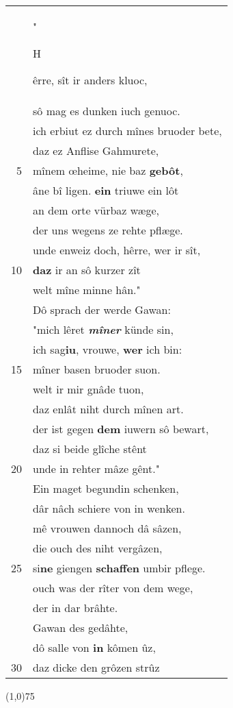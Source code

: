 \documentclass[8pt,a4paper,notitlepage]{article}
\begin{document}
\begin{table}[ht]
\begin{minipage}[t]{0.5\linewidth}
\begin{tabular}{rl}
 & "\begin{large}H\end{large}êrre, sît ir anders kluoc,\\ 
 & sô mag es dunken iuch genuoc.\\ 
 & ich erbiut ez durch mînes bruoder bete,\\ 
 & daz ez Anflise Gahmurete,\\ 
5 & mînem œheime, nie baz \textbf{gebôt},\\ 
 & âne bî ligen. \textbf{ein} triuwe ein lôt\\ 
 & an dem orte vürbaz wæge,\\ 
 & der uns wegens ze rehte pflæge.\\ 
 & unde enweiz doch, hêrre, wer ir sît,\\ 
10 & \textbf{daz} ir an sô kurzer zît\\ 
 & welt mîne minne hân."\\ 
 & Dô sprach der werde Gawan:\\ 
 & "mich lêret \textit{\textbf{mîner}} künde sin,\\ 
 & ich sag\textbf{iu}, vrouwe, \textbf{wer} ich bin:\\ 
15 & mîner basen bruoder suon.\\ 
 & welt ir mir gnâde tuon,\\ 
 & daz enlât niht durch mînen art.\\ 
 & der ist gegen \textbf{dem} iuwern sô bewart,\\ 
 & daz si beide glîche stênt\\ 
20 & unde in rehter mâze gênt."\\ 
 & Ein maget begundin schenken,\\ 
 & dâr nâch schiere von in wenken.\\ 
 & mê vrouwen dannoch dâ sâzen,\\ 
 & die ouch des niht vergâzen,\\ 
25 & si\textbf{ne} giengen \textbf{schaffen} umbir pflege.\\ 
 & ouch was der rîter von dem wege,\\ 
 & der in dar brâhte.\\ 
 & Gawan des gedâhte,\\ 
 & dô salle von \textbf{in} kômen ûz,\\ 
30 & daz dicke den grôzen strûz\\ 
\end{tabular}
\scriptsize
\line(1,0){75} \newline

\end{minipage}
\end{table}
\end{document}
